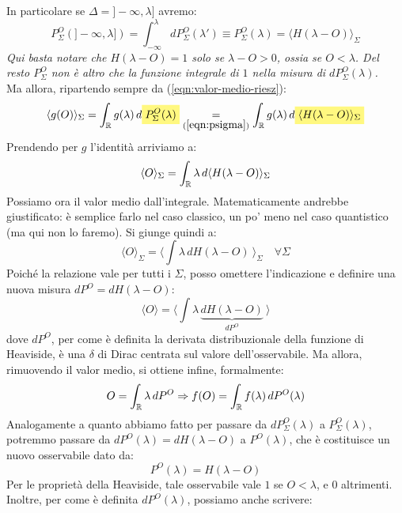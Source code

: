 \documentclass[FisicaTeorica.tex]{subfiles}
\begin{document}
In particolare se $\Delta= ]-\infty, \lambda]$ avremo:
\begin{equation}
P_\Sigma^O(]-\infty,\lambda]) = \int_{-\infty}^\lambda dP_\Sigma^O(\lambda') \equiv P_\Sigma^O(\lambda) = \langle H(\lambda-O)\rangle_\Sigma
\label{eqn:psigma}
\end{equation}
\textit{Qui basta notare che $H(\lambda-O) = 1$ solo se $\lambda-O>0$, ossia se $O < \lambda$. Del resto $P_\Sigma^O$ non è altro che la funzione integrale di $1$ nella misura di $dP_\Sigma^O(\lambda)$.}\\
Ma allora, ripartendo sempre da (\ref{eqn:valor-medio-riesz}):
\[
\langle g(O) \rangle_\Sigma = \int_\bb{R} g(\lambda)\, d\hlc{Yellow}{P_\Sigma^O(\lambda)} \underset{(\ref{eqn:psigma})}{=} \int_\bb{R} g(\lambda)\, d\hlc{Yellow}{\langle H(\lambda-O)\rangle_\Sigma}
\]
Prendendo per $g$ l'identità arriviamo a:
\begin{equation}
\langle O \rangle_\Sigma = \int_{\mathbb{R}} \lambda\, d\langle H(\lambda-O)\rangle_\Sigma
\label{eqn:Omedio}
\end{equation}
Possiamo ora  il valor medio dall'integrale. Matematicamente andrebbe giustificato: è semplice farlo nel caso classico, un po' meno nel caso quantistico (ma qui non lo faremo). Si giunge quindi a:
\[
\langle O \rangle_\Sigma = \langle \int \lambda\, dH(\lambda-O) \> \rangle_\Sigma\quad \forall \Sigma
\]
Poiché la relazione vale per tutti i $\Sigma$, posso omettere l'indicazione e definire una nuova misura $dP^O = dH(\lambda-O)$:
\[
\langle O \rangle = \langle \int \lambda \, \underbrace{dH(\lambda-O)}_{dP^O} \> \rangle
\]
dove $dP^O$, per come è definita la derivata distribuzionale della funzione di Heaviside, è una $\delta$ di Dirac centrata sul valore dell'osservabile. Ma allora, rimuovendo il valor medio, si ottiene infine, formalmente:
\begin{equation}
O = \int_{\mathbb{R}} \lambda\, dP^O \Rightarrow f(O) = \int_{\mathbb{R}} f(\lambda)\, dP^O(\lambda)
\label{eqn:osservabileformale}
\end{equation}
Analogamente a quanto abbiamo fatto per passare da $dP_\Sigma^O(\lambda)$ a $P_\Sigma^O(\lambda)$, potremmo passare da $dP^O(\lambda) = dH(\lambda-O)$ a $P^O(\lambda)$, che è costituisce un nuovo osservabile dato da:
\begin{equation}
P^O(\lambda) = H(\lambda-O)
\label{eqn:POdef}
\end{equation}
Per le proprietà della Heaviside, tale osservabile vale $1$ se $O < \lambda$, e $0$ altrimenti.
Inoltre, per come è definita $dP^O(\lambda)$, possiamo anche scrivere:
\end{document}
